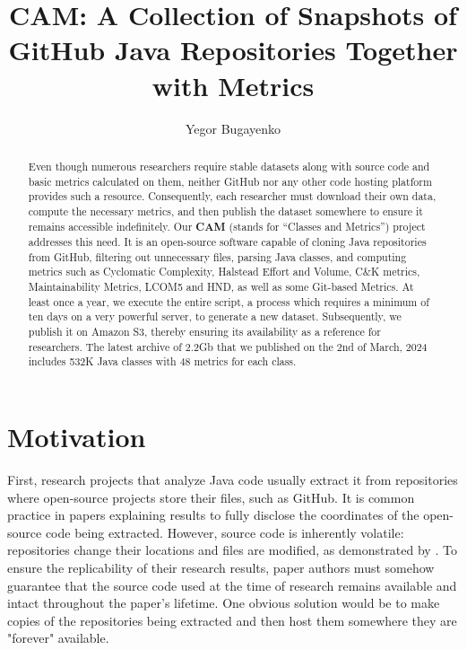 \documentclass[sigplan,nonacm,review,anonymous]{acmart}
\title{CAM: A Collection of Snapshots of GitHub Java Repositories Together with Metrics}
\author{Yegor Bugayenko}
\affiliation{\institution{Huawei, Russia, Moscow}\city{}\country{}}
\newcommand\cam{{\sffamily\bfseries CAM}}
\begin{document}

\begin{abstract}
Even though numerous researchers require stable datasets along with source code
and basic metrics calculated on them, neither GitHub nor any other code hosting
platform provides such a resource. Consequently, each researcher must download
their own data, compute the necessary metrics, and then publish the dataset
somewhere to ensure it remains accessible indefinitely. Our \cam{} (stands for
``Classes and Metrics'') project addresses this need. It is an open-source
software capable of cloning Java repositories from GitHub, filtering out
unnecessary files, parsing Java classes, and computing metrics such as
Cyclomatic Complexity, Halstead Effort and Volume, C\&K metrics,
Maintainability Metrics, LCOM5 and HND, as well as some Git-based Metrics. At
least once a year, we execute the entire script, a process which requires a
minimum of ten days on a very powerful server, to generate a new dataset.
Subsequently, we publish it on Amazon S3, thereby ensuring its availability as
a reference for researchers. The latest archive of 2.2Gb that we published on
the 2nd of March, 2024 includes 532K Java classes with 48 metrics for each
class.
\end{abstract}

\maketitle

\section{Motivation}\label{sec:motivation}

First, research projects that analyze Java code usually extract it from
repositories where open-source projects store their files, such as GitHub. It
is common practice in papers explaining results to fully disclose the
coordinates of the open-source code being extracted. However, source code is
inherently volatile: repositories change their locations and files are
modified, as demonstrated by \citet{5463348}. To ensure the replicability of
their research results, paper authors must somehow guarantee that the source
code used at the time of research remains available and intact throughout the
paper's lifetime. One obvious solution would be to make copies of the
repositories being extracted and then host them somewhere they are "forever"
available.
\end{document}
